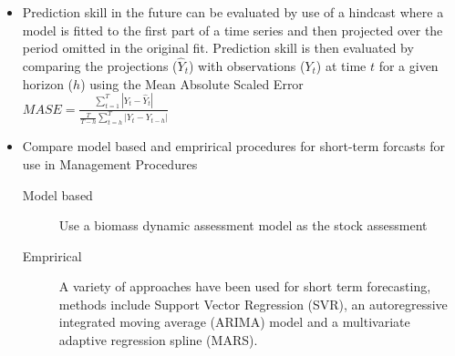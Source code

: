 \documentclass[a4paper,10pt]{article}
\begin{document}
\begin{itemize}
 \item Prediction skill in the future can be evaluated by use of a hindcast where a model is fitted to the first part of a time series and then projected over the period omitted in the original fit. Prediction skill is then evaluated by comparing the projections ($\hat{Y}_t$) with observations ($Y_t$) at time $t$ for a given horizon ($h$) using the Mean Absolute Scaled Error\\  
$MASE={\frac {\sum _{t=1}^{T} \left|Y_t-\hat{Y}_t \right|}{{\frac {T}{T-h}}\sum _{t=h}^{T}\left|Y_{t}-Y_{t-h}\right|}}$ 
 \item Compare model based and emprirical procedures for short-term forcasts for use in Management Procedures
  \begin{description}
    \item[Model based] Use a biomass dynamic assessment model as the stock assessment 
    \item[Emprirical] A variety of approaches have been used for short term forecasting, methods include Support Vector Regression (SVR), an autoregressive integrated moving average (ARIMA) model and a multivariate adaptive regression spline (MARS).
  \end{description}
\end{itemize}

\newpage
\end{document}
